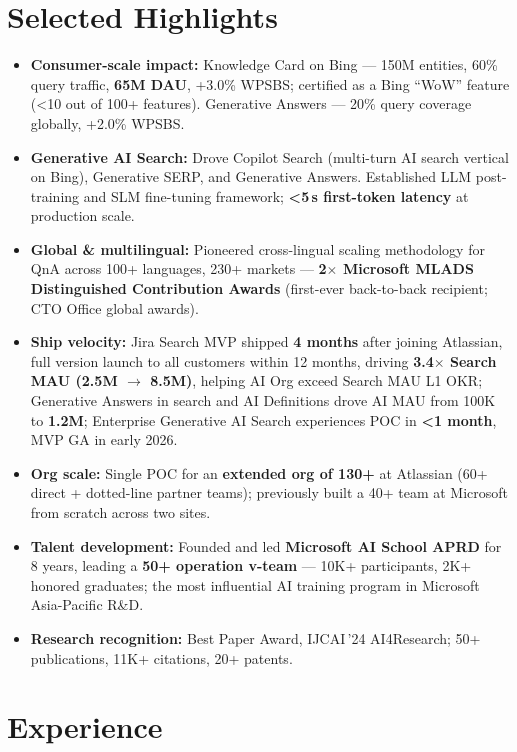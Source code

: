 \documentclass[10.5pt,letterpaper]{article}
\begin{document}
\section*{Selected Highlights}
\begin{itemize}
  \item \textbf{Consumer-scale impact:} Knowledge Card on Bing — 150M entities, 60\% query traffic, \textbf{65M DAU}, +3.0\% WPSBS; certified as a Bing ``WoW'' feature (<10 out of 100+ features). Generative Answers — 20\% query coverage globally, +2.0\% WPSBS.
  \item \textbf{Generative AI Search:} Drove Copilot Search (multi-turn AI search vertical on Bing), Generative SERP, and Generative Answers. Established LLM post-training and SLM fine-tuning framework; \textbf{<5\,s first-token latency} at production scale.
  \item \textbf{Global \& multilingual:} Pioneered cross-lingual scaling methodology for QnA across 100+ languages, 230+ markets — \textbf{2$\times$ Microsoft MLADS Distinguished Contribution Awards} (first-ever back-to-back recipient; CTO Office global awards).
  \item \textbf{Ship velocity:} Jira Search MVP shipped \textbf{4 months} after joining Atlassian, full version launch to all customers within 12 months, driving \textbf{3.4$\times$ Search MAU (2.5M $\to$ 8.5M)}, helping AI Org exceed Search MAU L1 OKR; Generative Answers in search and AI Definitions drove AI MAU from 100K to \textbf{1.2M}; Enterprise Generative AI Search experiences POC in \textbf{<1 month}, MVP GA in early 2026.
  \item \textbf{Org scale:} Single POC for an \textbf{extended org of 130+} at Atlassian (60+ direct + dotted-line partner teams); previously built a 40+ team at Microsoft from scratch across two sites.
  \item \textbf{Talent development:} Founded and led \textbf{Microsoft AI School APRD} for 8 years, leading a \textbf{50+ operation v-team} — 10K+ participants, 2K+ honored graduates; the most influential AI training program in Microsoft Asia-Pacific R\&D.
  \item \textbf{Research recognition:} Best Paper Award, IJCAI\,'24 AI4Research; 50+ publications, 11K+ citations, 20+ patents.
\end{itemize}

\section*{Experience}
\end{document}
